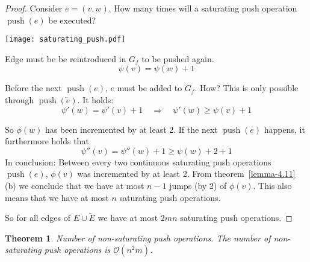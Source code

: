 \documentclass{article}
\newtheorem{theorem}{Theorem}
\DeclareMathOperator{\push}{push}
\begin{document}
\begin{proof}
  Consider $e = (v, w)$. How many times will a saturating push operation $\push(e)$ be executed?

  \begin{center}
    \texttt{[image: saturating\_push.pdf]}
  \end{center}

  Edge must be be reintroduced in $G_f$ to be pushed again.
  \[ \psi(v) = \psi(w) + 1 \]

  Before the next $\push(e)$, $e$ must be added to $G_f$.
  How? This is only possible through $\push(\overleftarrow{e})$. It holds:
  \[
    \psi'(w) = \psi'(v) + 1  \quad\Rightarrow\quad  \psi'(w) \geq \psi(v) + 1
  \]

  So $\phi(w)$ has been incremented by at least 2.
  If the next $\push(e)$ happens, it furthermore holds that
  \[
    \psi''(v) = \psi''(w) + 1 \geq \psi(w) + 2 + 1
  \]
  In conclusion: Between every two continuous saturating push operations $\push(e)$, $\phi(v)$ was incremented by at least 2.
  From theorem~\ref{lemma-4.11} (b) we conclude that we have at most $n-1$ jumps (by 2) of $\phi(v)$. This also means that we have at most $n$ saturating push operations.

  So for all edges of $E \cup \overleftarrow{E}$ we have at most $2mn$ saturating push operations.
\end{proof}

\begin{theorem}\label{lemma-4.13}
  \emph{Number of non-saturating push operations.}
  The number of non-saturating push operations is $\mathcal{O}(n^2m)$.
\end{theorem}
\end{document}
